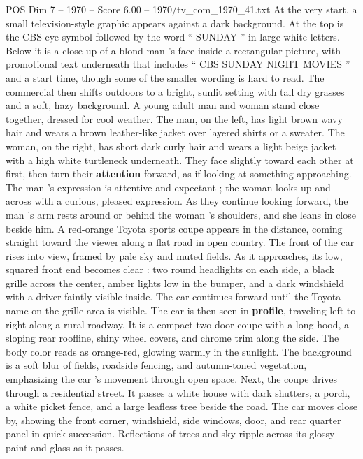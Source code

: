 \begin{textsample}{POS Dim 7 – 1970 – Score 6.00 – 1970/tv\_com\_1970\_41.txt}  \label{ex:f7_pos_038}
At the very start, a small television-style graphic appears against a dark background.
At the top is the CBS eye symbol followed by the word “ SUNDAY ” in large white letters.
Below it is a close-up of a blond man ’s face inside a rectangular picture, with promotional text underneath that includes “ CBS SUNDAY NIGHT MOVIES ” and a start time, though some of the smaller wording is hard to read.
The commercial then shifts outdoors to a bright, sunlit setting with tall dry grasses and a soft, hazy background.
A young adult man and woman stand close together, dressed for cool weather.
The man, on the left, has light brown wavy hair and wears a brown leather-like jacket over layered shirts or a sweater.
The woman, on the right, has short dark curly hair and wears a light beige jacket with a high white turtleneck underneath.
They face slightly toward each other at first, then turn their \textbf{attention} forward, as if looking at something approaching.
The man ’s expression is attentive and expectant ; the woman looks up and across with a curious, pleased expression.
As they continue looking forward, the man ’s arm rests around or behind the woman ’s shoulders, and she leans in close beside him.
A red-orange Toyota sports coupe appears in the distance, coming straight toward the viewer along a flat road in open country.
The front of the car rises into view, framed by pale sky and muted fields.
As it approaches, its low, squared front end becomes clear : two round headlights on each side, a black grille across the center, amber lights low in the bumper, and a dark windshield with a driver faintly visible inside.
The car continues forward until the Toyota name on the grille area is visible.
The car is then seen in \textbf{profile}, traveling left to right along a rural roadway.
It is a compact two-door coupe with a long hood, a sloping rear roofline, shiny wheel covers, and chrome trim along the side.
The body color reads as orange-red, glowing warmly in the sunlight.
The background is a soft blur of fields, roadside fencing, and autumn-toned vegetation, emphasizing the car ’s movement through open space.
Next, the coupe drives through a residential street.
It passes a white house with dark shutters, a porch, a white picket fence, and a large leafless tree beside the road.
The car moves close by, showing the front corner, windshield, side windows, door, and rear quarter panel in quick succession.
Reflections of trees and sky ripple across its glossy paint and glass as it passes.

\end{textsample}

